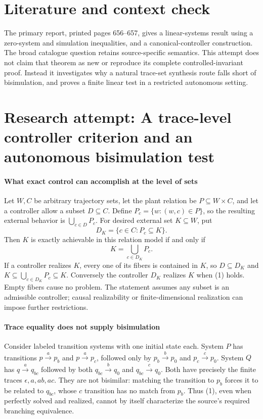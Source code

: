 \documentclass[11pt]{article}
\begin{document}
\section{Literature and context check}
The primary report, printed pages 656--657, gives a linear-systems result using a zero-system and simulation inequalities, and a canonical-controller construction. The broad catalogue question retains source-specific semantics. This attempt does not claim that theorem as new or reproduce its complete controlled-invariant proof. Instead it investigates why a natural trace-set synthesis route falls short of bisimulation, and proves a finite linear test in a restricted autonomous setting.
\section{Research attempt: A trace-level controller criterion and an autonomous bisimulation test}

\paragraph{What exact control can accomplish at the level of sets}
Let $W,C$ be arbitrary trajectory sets, let the plant relation be $P\subseteq W\times C$, and let a controller allow a subset $D\subseteq C$. Define $P_c=\{w:(w,c)\in P\}$, so the resulting external behavior is $\bigcup_{c\in D}P_c$. For desired external set $K\subseteq W$, put
\[
 D_K=\{c\in C:P_c\subseteq K\}.
\]
Then $K$ is exactly achievable in this relation model if and only if
\[
 K=\bigcup_{c\in D_K}P_c.
 \tag{1}
\]
If a controller realizes $K$, every one of its fibers is contained in $K$, so $D\subseteq D_K$ and $K\subseteq\bigcup_{c\in D_K}P_c\subseteq K$. Conversely the controller $D_K$ realizes $K$ when (1) holds. Empty fibers cause no problem. The statement assumes any subset is an admissible controller; causal realizability or finite-dimensional realization can impose further restrictions.

\paragraph{Trace equality does not supply bisimulation}
Consider labeled transition systems with one initial state each. System $P$ has transitions $p\xrightarrow{a}p_b$ and $p\xrightarrow{a}p_c$, followed only by $p_b\xrightarrow{b}p_0$ and $p_c\xrightarrow{c}p_0$. System $Q$ has $q\xrightarrow{a}q_{bc}$ followed by both $q_{bc}\xrightarrow{b}q_0$ and $q_{bc}\xrightarrow{c}q_0$. Both have precisely the finite traces $\epsilon,a,ab,ac$. They are not bisimilar: matching the transition to $p_b$ forces it to be related to $q_{bc}$, whose $c$ transition has no match from $p_b$. Thus (1), even when perfectly solved and realized, cannot by itself characterize the source's required branching equivalence.
\end{document}
